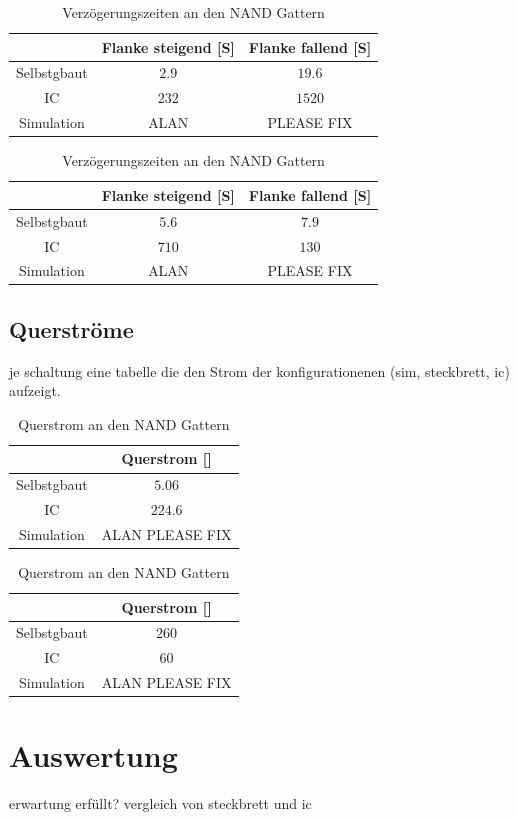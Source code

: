 \documentclass[11pt, a4paper]{article}
\begin{document}
\begin{table}[H]
	\center
	\begin{tabular}{c|c|c}
	& Flanke steigend [\si{\micro}S] & Flanke fallend [\si{\micro}S] 	\\ \hline
	Selbstgbaut & $2.9$ 	& $19.6$	\\
	IC 			& $232$ 	& $1520$	\\
	Simulation 	& ALAN		& PLEASE FIX\\
	\end{tabular}
	\caption{Verzögerungszeiten an den NOR Gattern}
	\label{verzögerungszeitenNOR}



	\center
	\begin{tabular}{c|c|c}
	& Flanke steigend [\si{\micro}S] & Flanke fallend [\si{\micro}S] 	\\ \hline
	Selbstgbaut & $5.6$ 	& $7.9$	\\
	IC 			& $710$ 	& $130$	\\
	Simulation 	& ALAN		& PLEASE FIX\\
	\end{tabular}
	\caption{Verzögerungszeiten an den NAND Gattern}
	\label{verzögerungszeitenNAND}
\end{table}

\subsection*{Querströme}
je schaltung eine tabelle die den Strom der konfigurationenen (sim, steckbrett, ic) aufzeigt.

\begin{table}[H]
	\center
	\begin{tabular}{c|c}
	& Querstrom [\si{\micro}]	\\ \hline
	Selbstgbaut & $5.06$ 		\\
	IC 			& $224.6$ 		\\
	Simulation 	& ALAN PLEASE FIX\\
	\end{tabular}
	\caption{Querstrom an den NOR Gattern}
	\label{querstromNAND}



	\center
	\begin{tabular}{c|c}
	& Querstrom [\si{\micro}]	\\ \hline
	Selbstgbaut & $260$ 		\\
	IC 			& $60$ 			\\
	Simulation 	& ALAN PLEASE FIX\\
	\end{tabular}
	\caption{Querstrom an den NAND Gattern}
	\label{querstromNAND}
\end{table}

\section*{Auswertung}
erwartung erfüllt? vergleich von steckbrett und ic
\end{document}

